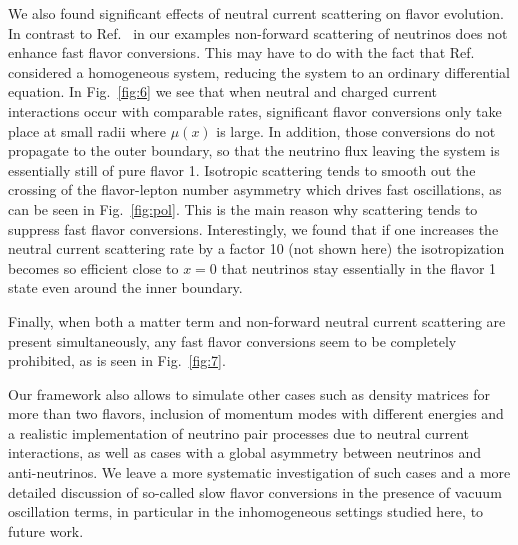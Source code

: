 \documentclass[prd,aps]{revtex4-2}
\begin{document}
We also found significant effects of neutral current scattering on flavor evolution.
In contrast to Ref.~\cite{Shalgar:2020wcx,Sasaki:2021zld} in our examples non-forward scattering of neutrinos does not enhance fast 
flavor conversions. This may have to do with the fact that Ref.~\cite{Shalgar:2020wcx,Sasaki:2021zld} considered a homogeneous 
system, reducing the system to an ordinary differential equation. In Fig.~\ref{fig:6} we see that when neutral and 
charged current interactions occur with comparable rates, significant flavor conversions only take place at small radii 
where $\mu(x)$ is large. In addition, those conversions do not propagate to the outer boundary, so that the neutrino 
flux leaving the system is essentially still of pure flavor 1. Isotropic scattering tends to smooth out the crossing of the 
flavor-lepton number asymmetry which drives fast oscillations, as can be seen in Fig.~\ref{fig:pol}. This is the main 
reason why scattering tends to suppress fast flavor conversions.
Interestingly, we found that if one increases the neutral current scattering rate by a factor 10 (not shown here)
the isotropization becomes so efficient close to $x=0$ that neutrinos stay essentially in the flavor 1 state even around
the inner boundary.

Finally, when both a matter term and non-forward neutral current scattering are present simultaneously, any fast
flavor conversions seem to be completely prohibited, as is seen in Fig.~\ref{fig:7}.

Our framework also allows to simulate other cases such as density matrices for more than two flavors, inclusion of momentum
modes with different energies and a realistic implementation of neutrino pair processes due to neutral current
interactions, as well as cases with a global asymmetry between neutrinos and anti-neutrinos.
We leave a more systematic investigation of such cases and a more detailed discussion of so-called slow flavor
conversions in the presence of vacuum oscillation terms, in particular in the inhomogeneous settings studied here, to future work.
\end{document}
